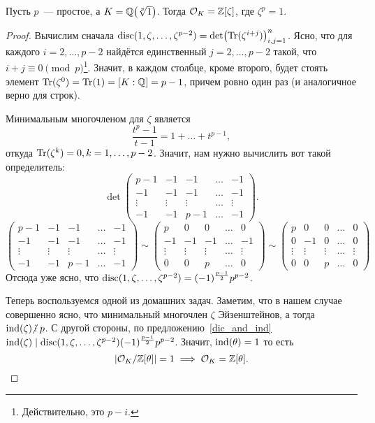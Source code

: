 		\begin{theorem} 
			Пусть $p$~--- простое, а $K = \Q\lr*{\sqrt[p]{1}}$. Тогда $\mathcal{O}_{K} = \mathbb{Z}[\zeta]$, где $\zeta^p = 1$.
		\end{theorem}
		\begin{proof}
			Вычислим сначала $\disc(1, \zeta, \ldots, \zeta^{p - 2}) = \det\lr*{\Tr(\zeta^{i + j})}_{i, j = 1}^{n}$. Ясно, что для каждого $i = 2, \ldots, p - 2$ найдётся единственный $j = 2, \ldots, p - 2$ такой, что $i + j \equiv 0 \pmod{p}$\footnote{Действительно, это $p - i$.}. Значит, в каждом столбце, кроме второго, будет стоять элемент $\operatorname{Tr}(\zeta^0) = \operatorname{Tr}(1) = [K : \mathbb{Q}] = p - 1$, причем ровно один раз (и аналогичное верно для строк).

			Минимальным многочленом для $\zeta$ является 
			\[
			  	\frac{t^p - 1}{t - 1} = 1 + \ldots + t^{p - 1},
			  \]  
			  откуда $\operatorname{Tr}(\zeta^{k}) = 0, k = 1, \ldots, p - 2$. Значит, нам нужно вычислить вот такой определитель: 
			  \[
			  	\det\begin{pmatrix} p - 1 & -1 & -1 & \ldots & - 1 \\ 
			  						-1    & -1 & -1 & \ldots &  -1 \\ 
			  						\vdots & \vdots & \vdots & \ldots & \vdots \\
			  						-1 & -1 & p - 1 & \ldots & -1  \end{pmatrix}.
			  \]
			\[
			  	\begin{pmatrix} p - 1 & -1 & -1 & \ldots & - 1 \\ 
			  						-1    & -1 & -1 & \ldots &  -1 \\ 
			  						\vdots & \vdots & \vdots & \ldots & \vdots \\
			  						-1 & -1 & p - 1 & \ldots & -1  \end{pmatrix} \sim \begin{pmatrix} p  & 0 & 0 & \ldots & 0 \\ 
			  						-1    & -1 & -1 & \ldots &  -1 \\ 
			  						\vdots & \vdots & \vdots & \ldots & \vdots \\
			  						0 & 0 & p  & \ldots & 0  \end{pmatrix}	\sim \begin{pmatrix} p  & 0 & 0 & \ldots & 0 \\ 
			  						0    & -1 & 0 & \ldots &  0 \\ 
			  						\vdots & \vdots & \vdots & \ldots & \vdots \\
			  						0 & 0 & p  & \ldots & 0  \end{pmatrix}
			 \]  
			 Отсюда уже ясно, что $\operatorname{disc}(1, \zeta, \ldots, \zeta^{p - 2}) = (-1)^{\frac{p - 1}{2}} p^{p - 2}$. 

			 Теперь воспользуемся одной из домашних задач. Заметим, что в нашем случае совершенно ясно, что минимальный многочлен $\zeta$ Эйзенштейнов, а тогда $\ind(\zeta) \notdivby p$. С другой стороны, по предложению~\ref{dic_and_ind} $\operatorname{ind}(\zeta) \mid \operatorname{disc}(1, \zeta, \ldots, \zeta^{p - 2}) (-1)^{\frac{p - 1}{2}} p^{p - 2}$. Значит, $\operatorname{ind}(\theta) = 1$ то есть 
			 \[
			 	|\mathcal{O}_{K}/\mathbb{Z}[\theta]| = 1 \implies \mathcal{O}_{K} = \mathbb{Z}[\theta].
			 \]
		\end{proof}	 

